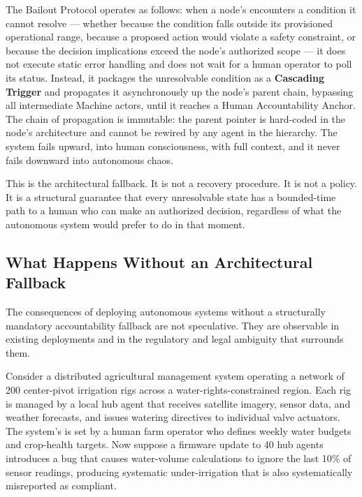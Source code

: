 The Bailout Protocol operates as follows: when a node's \bounds encounters a condition it cannot resolve — whether because the condition falls outside its provisioned operational range, because a proposed action would violate a safety constraint, or because the decision implications exceed the node's authorized scope — it does not execute static error handling and does not wait for a human operator to poll its status. Instead, it packages the unresolvable condition as a \textbf{Cascading Trigger} and propagates it asynchronously up the node's parent chain, bypassing all intermediate Machine actors, until it reaches a Human Accountability Anchor. The chain of propagation is immutable: the parent pointer is hard-coded in the node's architecture and cannot be rewired by any agent in the hierarchy. The system fails upward, into human consciousness, with full context, and it never fails downward into autonomous chaos.

This is the architectural fallback. It is not a recovery procedure. It is not a policy. It is a structural guarantee that every unresolvable state has a bounded-time path to a human who can make an authorized decision, regardless of what the autonomous system would prefer to do in that moment.

\subsection{What Happens Without an Architectural Fallback}

The consequences of deploying autonomous systems without a structurally mandatory accountability fallback are not speculative. They are observable in existing deployments and in the regulatory and legal ambiguity that surrounds them.

Consider a distributed agricultural management system operating a network of 200 center-pivot irrigation rigs across a water-rights-constrained region. Each rig is managed by a local hub agent that receives satellite imagery, sensor data, and weather forecasts, and issues watering directives to individual valve actuators. The system's \purpose is set by a human farm operator who defines weekly water budgets and crop-health targets. Now suppose a firmware update to 40 hub agents introduces a bug that causes water-volume calculations to ignore the last 10\% of sensor readings, producing systematic under-irrigation that is also systematically misreported as compliant.

